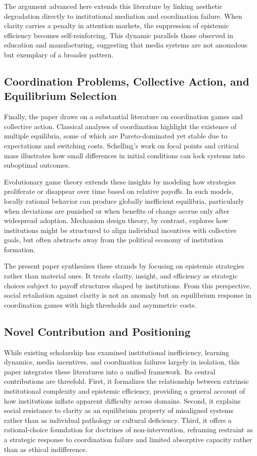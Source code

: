 \documentclass[11pt]{article}
\begin{document}
The argument advanced here extends this literature by linking aesthetic degradation directly to institutional mediation and coordination failure. When clarity carries a penalty in attention markets, the suppression of epistemic efficiency becomes self-reinforcing. This dynamic parallels those observed in education and manufacturing, suggesting that media systems are not anomalous but exemplary of a broader pattern.

\subsection{Coordination Problems, Collective Action, and Equilibrium Selection}

Finally, the paper draws on a substantial literature on coordination games and collective action. Classical analyses of coordination highlight the existence of multiple equilibria, some of which are Pareto-dominated yet stable due to expectations and switching costs. Schelling’s work on focal points and critical mass illustrates how small differences in initial conditions can lock systems into suboptimal outcomes.

Evolutionary game theory extends these insights by modeling how strategies proliferate or disappear over time based on relative payoffs. In such models, locally rational behavior can produce globally inefficient equilibria, particularly when deviations are punished or when benefits of change accrue only after widespread adoption. Mechanism design theory, by contrast, explores how institutions might be structured to align individual incentives with collective goals, but often abstracts away from the political economy of institution formation.

The present paper synthesizes these strands by focusing on epistemic strategies rather than material ones. It treats clarity, insight, and efficiency as strategic choices subject to payoff structures shaped by institutions. From this perspective, social retaliation against clarity is not an anomaly but an equilibrium response in coordination games with high thresholds and asymmetric costs.

\subsection{Novel Contribution and Positioning}

While existing scholarship has examined institutional inefficiency, learning dynamics, media incentives, and coordination failures largely in isolation, this paper integrates these literatures into a unified framework. Its central contributions are threefold. First, it formalizes the relationship between extrinsic institutional complexity and epistemic efficiency, providing a general account of how institutions inflate apparent difficulty across domains. Second, it explains social resistance to clarity as an equilibrium property of misaligned systems rather than as individual pathology or cultural deficiency. Third, it offers a rational-choice foundation for doctrines of non-intervention, reframing restraint as a strategic response to coordination failure and limited absorptive capacity rather than as ethical indifference.
\end{document}
